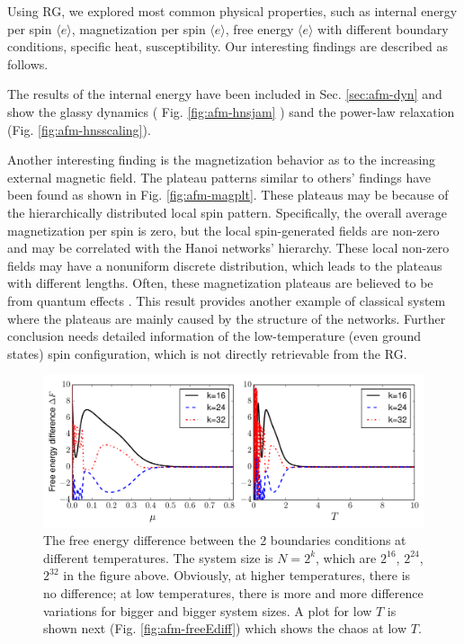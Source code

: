 Using RG, we explored most common physical properties, such as internal energy per spin $\langle e\rangle$, magnetization per spin $\langle e\rangle$, free energy $\langle e\rangle$ with different boundary conditions, specific heat, susceptibility. Our interesting findings are described as follows.

The results of the internal energy have been included in Sec. \ref{sec:afm-dyn} and show the glassy dynamics ( Fig. \ref{fig:afm-hnsjam} ) sand the power-law relaxation (Fig. \ref{fig:afm-hnsscaling}). 

Another interesting finding is the magnetization behavior as to the increasing external
 magnetic field. The plateau patterns similar to others' findings \cite{ohanyan2003mag} have
 been found as shown in Fig. \ref{fig:afm-magplt}. These plateaus may be because of the
 hierarchically distributed local spin pattern. Specifically, the overall average magnetization per
 spin is zero, but the local spin-generated fields are non-zero and may be correlated with the
 Hanoi networks' hierarchy. These local non-zero fields may have a nonuniform discrete
 distribution, which leads to the plateaus with different lengths. Often, these magnetization
 plateaus are believed to be from quantum effects 
\cite{kageyama1999pleatu, kageyama2000direct}. This result provides another example of
 classical system where the plateaus are mainly caused by the structure of the networks. 
Further conclusion needs detailed information of the low-temperature (even ground states)
 spin configuration, which is not directly retrievable from the RG.

\begin{figure}[h]
\centering \includegraphics[width=1\columnwidth]{Chapter-3/freeE_lowT2highT.pdf}
\protect\caption{The free energy difference between the 2 boundaries conditions at different temperatures. The system size is $N=2^k$, which are $2^{16}$, $2^{24}$, $2^{32}$ in the figure above. Obviously, at higher temperatures, there is no difference; at low temperatures, there is more and more difference variations for bigger and bigger system sizes. A plot for low $T$ is shown next (Fig. \ref{fig:afm-freeEdiff}) which shows the chaos at low $T$.  }
\label{fig:afm-freeEdiff_allT} 
\end{figure}

